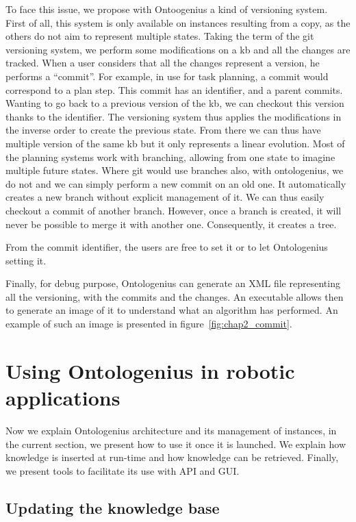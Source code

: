To face this issue, we propose with Ontoogenius a kind of versioning system. First of all, this system is only available on instances resulting from a copy, as the others do not aim to represent multiple states. Taking the term of the git versioning system, we perform some modifications on a \acrshort{kb} and all the changes are tracked. When a user considers that all the changes represent a version, he performs a ``commit''. For example, in use for task planning, a commit would correspond to a plan step. This commit has an identifier, and a parent commits. Wanting to go back to a previous version of the \acrshort{kb}, we can checkout this version thanks to the identifier. The versioning system thus applies the modifications in the inverse order to create the previous state. From there we can thus have multiple version of the same \acrshort{kb} but it only represents a linear evolution. Most of the planning systems work with branching, allowing from one state to imagine multiple future states. Where git would use branches also, with ontologenius, we do not and we can simply perform a new commit on an old one. It automatically creates a new branch without explicit management of it. We can thus easily checkout a commit of another branch. However, once a branch is created, it will never be possible to merge it with another one. Consequently, it creates a tree.

From the commit identifier, the users are free to set it or to let Ontologenius setting it.

Finally, for debug purpose, Ontologenius can generate an XML file representing all the versioning, with the commits and the changes. An executable allows then to generate an image of it to understand what an algorithm has performed. An example of such an image is presented in figure~\ref{fig:chap2_commit}.

\section{Using Ontologenius in robotic applications}

Now we explain Ontologenius architecture and its management of instances, in the current section, we present how to use it once it is launched. We explain how knowledge is inserted at run-time and how knowledge can be retrieved. Finally, we present tools to facilitate its use with API and GUI.

\subsection{Updating the knowledge base}

